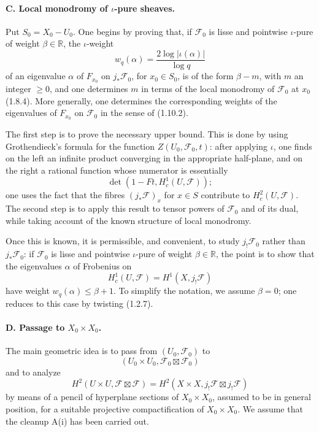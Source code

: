 \documentclass[11pt]{article}
\theoremstyle{remark}
\begin{document}
\paragraph{C. Local monodromy of $\iota$-pure sheaves.}
Put $S_0=X_0-U_0$. One begins by proving that, if $\mathcal F_0$ is lisse and pointwise $\iota$-pure of weight $\beta\in\mathbb R$, the $\iota$-weight
\[
w_q(\alpha)=\frac{2\log |\iota(\alpha)|}{\log q}
\]
of an eigenvalue $\alpha$ of $F_{x_0}$ on $j_{*}\mathcal F_0$, for $x_0\in S_0$, is of the form $\beta-m$, with $m$ an integer $\ge 0$, and one determines $m$ in terms of the local monodromy of $\mathcal F_0$ at $x_0$ (1.8.4). More generally, one determines the corresponding weights of the eigenvalues of $F_{x_0}$ on $\mathcal F_0$ in the sense of (1.10.2).

The first step is to prove the necessary upper bound. This is done by using Grothendieck's formula for the function $Z(U_0,\mathcal F_0,t)$: after applying $\iota$, one finds on the left an infinite product converging in the appropriate half-plane, and on the right a rational function whose numerator is essentially
\[
\det(1-Ft,H^1_c(U,\mathcal F));
\]
one uses the fact that the fibres $(j_{*}\mathcal F)_x$ for $x\in S$ contribute to $H^2_c(U,\mathcal F)$. The second step is to apply this result to tensor powers of $\mathcal F_0$ and of its dual, while taking account of the known structure of local monodromy.

Once this is known, it is permissible, and convenient, to study $j_{!}\mathcal F_0$ rather than $j_{*}\mathcal F_0$: if $\mathcal F_0$ is lisse and pointwise $\iota$-pure of weight $\beta\in\mathbb R$, the point is to show that the eigenvalues $\alpha$ of Frobenius on
\[
H^1_c(U,\mathcal F)=H^1(X,j_{!}\mathcal F)
\]
have weight $w_q(\alpha)\le \beta+1$. To simplify the notation, we assume $\beta=0$; one reduces to this case by twisting (1.2.7).

\paragraph{D. Passage to $X_0\times X_0$.}
The main geometric idea is to pass from $(U_0,\mathcal F_0)$ to
\[
(U_0\times U_0,\mathcal F_0\boxtimes\mathcal F_0)
\]
and to analyze
\[
H^2(U\times U,\mathcal F\boxtimes\mathcal F)
  = H^2(X\times X,j_{!}\mathcal F\boxtimes j_{!}\mathcal F)
\]
by means of a pencil of hyperplane sections of $X_0\times X_0$, assumed to be in general position, for a suitable projective compactification of $X_0\times X_0$. We assume that the cleanup A(i) has been carried out.
\end{document}
